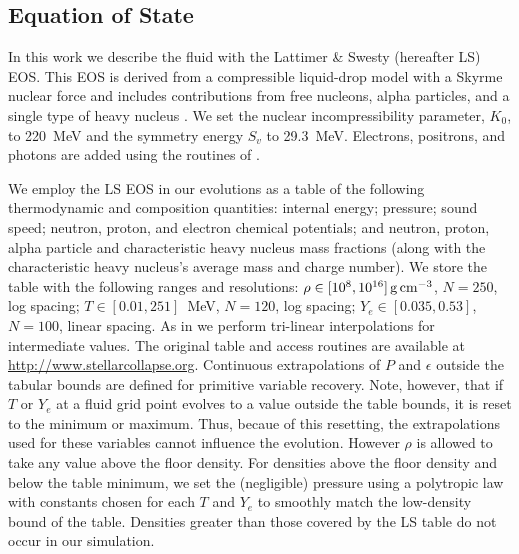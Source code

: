 \subsection{Equation of State}
\label{sec:EOS}

In this work we describe the fluid with the Lattimer \& Swesty (hereafter LS) EOS.
This EOS is derived from a compressible
liquid-drop model with a Skyrme nuclear force and includes contributions
from free nucleons, alpha particles, and a single type of heavy nucleus \citep{Lattimer:1991nc}.
We set the nuclear incompressibility parameter, $K_0$, to 220~MeV and the
symmetry energy $S_v$ to 29.3~MeV.
Electrons, positrons, and photons are
added using the routines of \cite{1999ApJS..125..277T}.


We employ the LS EOS in our evolutions as a table of the following thermodynamic
and composition quantities: internal energy; pressure; sound speed;
neutron, proton, and electron chemical potentials;
and neutron, proton, alpha particle and characteristic heavy nucleus mass fractions
(along with the characteristic heavy nucleus's average mass and charge number).
We store the table with the following ranges and resolutions:
$\rho \in [10^{8},10^{16}]\rm\,g\,cm^{-3}$,
	$N=250$, log spacing;
$T \in [0.01,251]$~MeV,
	$N=120$, log spacing;
$Y_e \in [0.035,0.53]$,
	$N=100$, linear spacing.
As in \cite{OConnor2010} we perform tri-linear interpolations
for intermediate values. The original table and access routines
are available at \url{http://www.stellarcollapse.org}.
Continuous extrapolations of $P$ and $\epsilon$ outside the tabular bounds
are defined for primitive variable recovery. Note, however, that if $T$ or $Y_e$ at a
fluid grid point evolves to a value outside the table bounds, it is reset to the minimum or maximum.
Thus, becaue of this resetting, the extrapolations used for these
variables cannot influence the evolution.
However $\rho$ is allowed to take any value above the floor density. 
For densities above the floor density and below the table minimum, we
set the (negligible) pressure using a polytropic law with constants chosen
for each $T$ and $Y_e$ to smoothly match the low-density bound of the table. 
Densities greater than those
covered by the LS table do not occur in our simulation.

